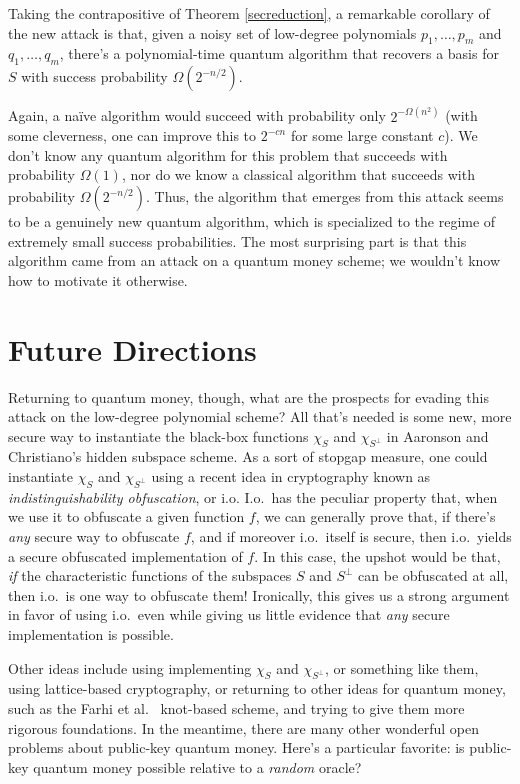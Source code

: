 \documentclass[11pt]{report}
\theoremstyle{plain}
\theoremstyle{definition}
\begin{document}
Taking the contrapositive of Theorem \ref{secreduction}, a remarkable corollary of the new attack is that, given a noisy set of low-degree polynomials $p_1,\ldots,p_m$ and $q_1,\ldots,q_m$, there's a polynomial-time quantum algorithm that recovers a basis for $S$ with success probability $\Omega(2^{-n/2})$.

Again, a na\"{i}ve algorithm would succeed with probability only $2^{-\Omega(n^2)}$ (with some cleverness, one can improve this to $2^{-cn}$ for some large constant $c$).  We don't know any quantum algorithm for this problem that succeeds with probability $\Omega(1)$, nor do we know a classical algorithm that succeeds with probability $\Omega(2^{-n/2})$.  Thus, the algorithm that emerges from this attack seems to be a genuinely new quantum algorithm, which is specialized to the regime of extremely small success probabilities.  The most surprising part is that this algorithm came from an attack on a quantum money scheme; we wouldn't know how to motivate it otherwise.

\section{Future Directions}

Returning to quantum money, though, what are the prospects for evading this attack on the low-degree polynomial scheme?  All that's needed is some new, more secure way to instantiate the black-box functions $\chi_S$ and $\chi_{S^\perp}$ in Aaronson and Christiano's hidden subspace scheme.  As a sort of stopgap measure, one could instantiate $\chi_S$ and $\chi_{S^\perp}$ using a recent idea in cryptography known as {\em indistinguishability obfuscation}, or i.o.  I.o.\ has the peculiar property that, when we use it to obfuscate a given function $f$, we can generally prove that, if there's {\em any} secure way to obfuscate $f$, and if moreover i.o.\ itself is secure, then i.o.\ yields a secure obfuscated implementation of $f$.  In this case, the upshot would be that, {\em if} the characteristic functions of the subspaces $S$ and $S^\perp$ can be obfuscated at all, then i.o.\ is one way to obfuscate them!  Ironically, this gives us a strong argument in favor of using i.o.\, even while giving us little evidence that {\em any} secure implementation is possible.

Other ideas include using implementing $\chi_S$ and $\chi_{S^\perp}$, or something like them, using lattice-based cryptography, or returning to other ideas for quantum money, such as the Farhi et al.\ \cite{knots} knot-based scheme, and trying to give them more rigorous foundations.  In the meantime, there are many other wonderful open problems about public-key quantum money.  Here's a particular favorite: is public-key quantum money possible relative to a {\em random} oracle?
\end{document}
